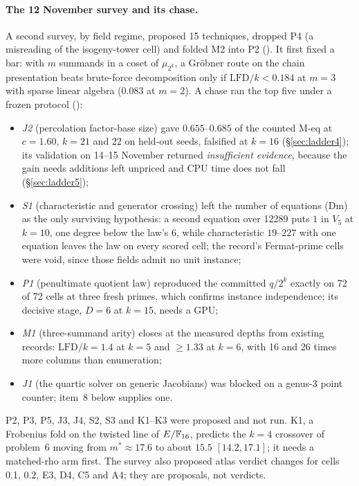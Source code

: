 \paragraph{The 12 November survey and its chase.} A second survey, by
field regime, proposed 15 techniques, dropped P4 (a misreading of the
isogeny-tower cell) and folded M2 into P2 (). It
first fixed a bar: with $m$ summands in a coset of $\mu_{2^k}$, a Gröbner
route on the chain presentation beats brute-force decomposition only if
$\mathrm{LFD}/k<0.184$ at $m=3$ with sparse linear algebra ($0.083$ at
$m=2$). A chase ran the top five under a frozen protocol
():
\begin{itemize}
\item \emph{J2} (percolation factor-base size) gave $0.655$--$0.685$ of
  the counted M-eq at $c=1.60$, $k=21$ and $22$ on held-out seeds,
  falsified at $k=16$ (\S\ref{sec:ladder4}); its validation on 14--15
  November returned \emph{insufficient evidence}, because the gain needs
  additions left unpriced and CPU time does not fall
  (\S\ref{sec:ladder5});
\item \emph{S1} (characteristic and generator crossing) left the number of
  equations (Dm) as the only surviving hypothesis: a second equation over
  12289 puts $1$ in $V_5$ at $k=10$, one degree below the law's 6, while characteristic $19$--$227$
  with one equation leaves the law on every scored cell; the record's
  Fermat-prime cells were void, since those fields admit no unit instance;
\item \emph{P1} (penultimate quotient law) reproduced the committed
  $q/2^k$ exactly on 72 of 72 cells at three fresh primes, which confirms
  instance independence; its decisive stage, $D=6$ at $k=15$, needs a GPU;
\item \emph{M1} (three-summand arity) closes at the measured depths from
  existing records: $\mathrm{LFD}/k=1.4$ at $k=5$ and $\ge1.33$ at $k=6$, with
  16 and 26 times more columns than enumeration;
\item \emph{J1} (the quartic solver on generic Jacobians) was blocked on a
  genus-3 point counter; item~8 below supplies one.
\end{itemize}
P2, P3, P5, J3, J4, S2, S3 and K1--K3 were proposed and not run. K1, a
Frobenius fold on the twisted line of $E/\mathbb{F}_{16}$, predicts the $k=4$
crossover of problem~6 moving from $m^*\approx17.6$ to about $15.5$
$[14.2,17.1]$; it needs a matched-rho arm first. The survey also proposed
atlas verdict changes for cells 0.1, 0.2, E3, D4, C5 and A4; they are
proposals, not verdicts.

